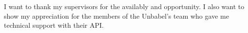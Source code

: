 \begin{acknowledgements}

I want to thank my supervisors for the availably and opportunity.  I also want to show my appreciation for the members of the Unbabel's team who gave me technical support with their API.

\end{acknowledgements}
